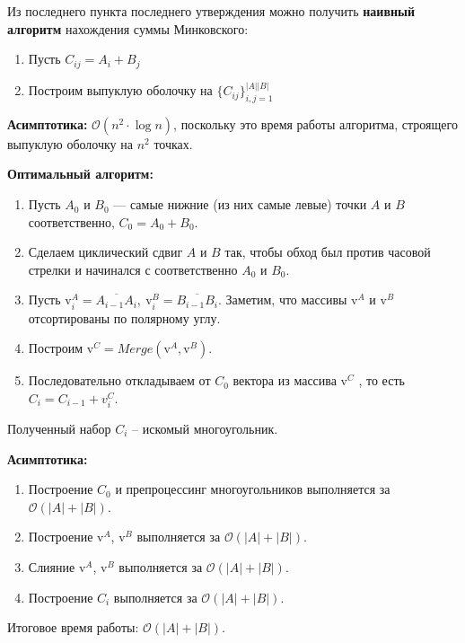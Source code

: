 Из последнего пункта последнего утверждения можно получить \textbf{наивный алгоритм} нахождения суммы Минковского:
\begin{enumerate}
    \item Пусть $C_{ij} = A_i + B_j$
    \item Построим выпуклую оболочку на $\{C_{ij}\}_{i,j=1} ^ {|A||B|}$
\end{enumerate}
\textbf{Асимптотика:} $\mathcal{O}(n^2 \cdot \log n)$, поскольку это время работы алгоритма, строящего выпуклую оболочку на $n^2$ точках.\newline

\textbf{Оптимальный алгоритм:}
\begin{enumerate}
    \item Пусть $A_0$ и $B_0$ — самые нижние (из них самые левые) точки $A$ и $B$ соответственно, $C_0 = A_0 + B_0$.
    \item Сделаем циклический сдвиг $A$ и $B$ так, чтобы обход был против часовой стрелки и начинался с соответственно $A_0$ и $B_0$.
    \item Пусть $\text{v}^A_i = \overline{A_{i - 1}A_i}, \ \text{v}^B_i = \overline{B_{i-1}B_i}$. Заметим, что массивы $\text{v}^A$ и $\text{v}^B$ отсортированы по полярному углу.
    \item Построим $\text{v}^C = Merge(\text{v}^A, \text{v}^B)$.
    \item Последовательно откладываем от $C_0$ вектора из массива $\text{v}^C$ , то есть $C_i = C_{i-1} + v^C_i$.
\end{enumerate}
Полученный набор $C_i$ -- искомый многоугольник.

\textbf{Асимптотика:} \begin{enumerate}
    \item Построение $C_0$ и препроцессинг многоугольников выполняется за $\mathcal{O}(|A| + |B|)$.
    \item Построение  $\text{v}^A$, $\text{v}^B$ выполняется за $\mathcal{O}(|A| + |B|)$.
    \item Слияние  $\text{v}^A$, $\text{v}^B$ выполняется за $\mathcal{O}(|A| + |B|)$.
    \item Построение  $C_i$ выполняется за $\mathcal{O}(|A| + |B|)$.
\end{enumerate}
Итоговое время работы: $\mathcal{O}(|A| + |B|)$.

\pagebreak
